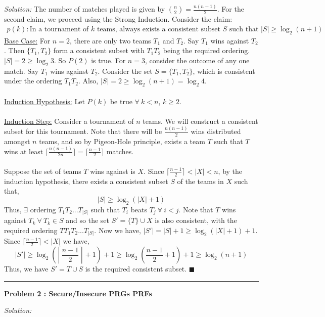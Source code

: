 \documentclass[a4paper, 11pt]{article}
\newenvironment{problem}[2][Problem]
    { \begin{mdframed}[backgroundcolor=gray!20] \textbf{#1 #2} \\}
    {  \end{mdframed}}
\newenvironment{solution}
    {\textit{Solution:}}
    {}
\newcommand{\hr}{\noindent\rule{7in}{2.8pt}}
\begin{document}
\begin{solution}
The number of matches played is given by ${n \choose 2} =  \frac{n(n-1)}{2}$. For the second claim, we proceed using the Strong Induction. Consider the claim: 
\begin{align*}
    p(k): \text{In a tournament of } k \text{ teams, always exists a consistent subset } S \text{ such that } |S| \geq \log_2 (n+1)
\end{align*}
\underline{Base Case:} For $n=2$, there are only two teams $T_1$ and $T_2$. Say $T_1$ wins against $T_2$. Then $\{ T_1, T_2 \}$ form a consistent subset with $T_1T_2$ being the required ordering. $|S| = 2 \geq \log_2 3$. So $P(2)$ is true. For $n = 3$, consider the outcome of any one match. Say $T_1$ wins against $T_2$. Consider the set $S = \{ T_1, T_2 \} $, which is consistent under the ordering $T_1 T_2$. Also, $|S| = 2 \geq \log_2{(n + 1)} = \log_2{4}$.
\\
\\
\underline{Induction Hypothesis:} Let $P(k)$ be true $\forall \ k < n$, $k \geq 2$.
\\
\\
\underline{Induction Step:} Consider a tournament of $n$ teams. We will construct a consistent subset for this tournament. Note that there will be $\frac{n(n-1)}{2}$ wins distributed amongst $n$ teams, and so by Pigeon-Hole principle, exists a team $T$ such that $T$ wins at least $\lceil \frac{n(n-1)}{2n} \rceil = \lceil \frac{n-1}{2} \rceil$ matches. 
\\
\\
Suppose the set of teams $T$ wins against is $X$. Since $\lceil \frac{n-1}{2} \rceil < |X| < n$, by the induction hypothesis, there exists a consistent subset $S$ of the teams in $X$ such that, 
$$|S| \geq \log_2{(|X|+1)}$$
Thus, $\exists$ ordering $T_1 T_2 ... T_{|S|} $ such that $T_i$ beats $T_j \ \forall \ i < j $. Note that $T$ wins against $T_k \ \forall \ T_k \in S$ and so the set $S' = \{T \} \cup X$ is also consistent, with the required ordering $TT_1 T_2 ... T_{|S|}$. Now we have, $|S'| = |S|+1 \geq \log_2{(|X|+1)} + 1$. 
Since $\lceil \frac{n-1}{2} \rceil < |X|$ we have, 
$$|S'| \geq \log_2{\left(\left \lceil \frac{n-1}{2} \right \rceil+1 \right)} + 1 \geq \log_2{\left(\frac{n-1}{2} + 1 \right)} + 1 \geq \log_2{(n+1)}$$
Thus, we have $S' = T \cup S$ is the required consistent subset. $\blacksquare$
\end{solution} 
\\
\hr

\begin{problem}{2 : Secure/Insecure PRGs PRFs}\end{problem}
\begin{solution}

\end{solution} 
\end{document}
